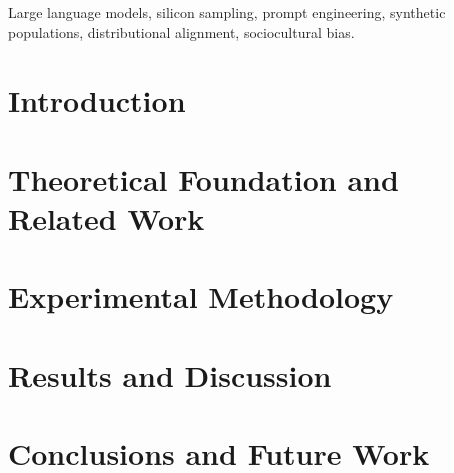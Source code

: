 \documentclass[conference]{IEEEtran}
\begin{document}
\begin{IEEEkeywords}
Large language models, silicon sampling, prompt engineering,
synthetic populations, distributional alignment, sociocultural bias.
\end{IEEEkeywords}

\section{Introduction}\label{sec:introduction}


\section{Theoretical Foundation and Related Work}\label{sec:related_work}


\section{Experimental Methodology}\label{sec:methodology}


\section{Results and Discussion}\label{sec:results}


\section{Conclusions and Future Work}\label{sec:conclusion}




\end{document}
